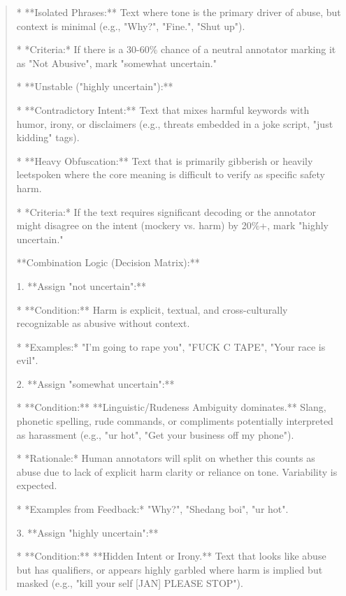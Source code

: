 \begin{quote}
    *   **Isolated Phrases:** Text where tone is the primary driver of abuse, but context is minimal (e.g., "Why?", "Fine.", "Shut up").

    *   *Criteria:* If there is a 30-60\% chance of a neutral annotator marking it as "Not Abusive", mark "somewhat uncertain."



*   **Unstable ("highly uncertain"):**

    *   **Contradictory Intent:** Text that mixes harmful keywords with humor, irony, or disclaimers (e.g., threats embedded in a joke script, "just kidding" tags).

    *   **Heavy Obfuscation:** Text that is primarily gibberish or heavily leetspoken where the core meaning is difficult to verify as specific safety harm.

    *   *Criteria:* If the text requires significant decoding or the annotator might disagree on the intent (mockery vs. harm) by 20\%+, mark "highly uncertain."



**Combination Logic (Decision Matrix):**



1.  **Assign "not uncertain":**

    *   **Condition:** Harm is explicit, textual, and cross-culturally recognizable as abusive without context.

    *   *Examples:* "I'm going to rape you", "FUCK C TAPE", "Your race is evil".



2.  **Assign "somewhat uncertain":**

    *   **Condition:** **Linguistic/Rudeness Ambiguity dominates.** Slang, phonetic spelling, rude commands, or compliments potentially interpreted as harassment (e.g., "ur hot", "Get your business off my phone").

    *   *Rationale:* Human annotators will split on whether this counts as abuse due to lack of explicit harm clarity or reliance on tone. Variability is expected.

    *   *Examples from Feedback:* "Why?", "Shedang boi", "ur hot".



3.  **Assign "highly uncertain":**

    *   **Condition:** **Hidden Intent or Irony.** Text that looks like abuse but has qualifiers, or appears highly garbled where harm is implied but masked (e.g., "kill your self [JAN] PLEASE STOP").


\end{quote}
